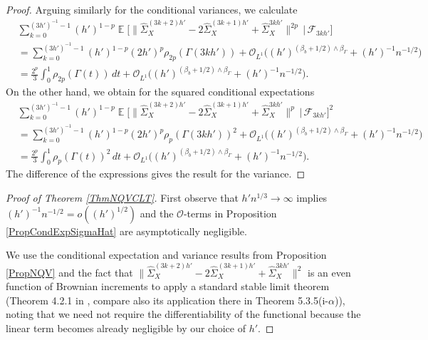 \documentclass[preprint,aos]{imsart}
\numberwithin{equation}{section}
\theoremstyle{remark}
\DeclareMathOperator{\E}{{\mathbb E}}
\providecommand{\norm}[1]{\lVert #1 \rVert}
\begin{document}
\begin{appendix}
\begin{proof}
Arguing similarly for the conditional variances,  we calculate
\begin{align}
&\sum_{k=0}^{(3h')^{-1}-1}(h')^{1-p}\E\Big[\norm{\hat\Sigma_X^{(3k+2)h'}-2\hat\Sigma_X^{(3k+1)h'}+\hat\Sigma_X^{3kh'}}^{2p}\,\Big|\,{\mathcal F}_{3kh'}\Big]\nonumber\\
&=\sum_{k=0}^{(3h')^{-1}-1}(h')^{1-p}(2h')^p\rho_{2p}(\Gamma(3kh'))+{\mathcal O}_{L^1}\Big((h')^{(\beta_b+1/2)\wedge \beta_\Gamma}+(h')^{-1}n^{-1/2}\Big)\nonumber\\
&= \frac{2^p}3\int_0^1 \rho_{2p}(\Gamma(t))\,dt+{\mathcal O}_{L^1}\Big((h')^{(\beta_b+1/2)\wedge \beta_\Gamma}+(h')^{-1}n^{-1/2}\Big).\label{EqNorm2p}
\end{align}
On the other hand, we obtain for the squared conditional expectations
\begin{align*}
&\sum_{k=0}^{(3h')^{-1}-1}(h')^{1-p}\E\Big[\norm{\hat\Sigma_X^{(3k+2)h'}-2\hat\Sigma_X^{(3k+1)h'}+\hat\Sigma_X^{3kh'}}^p\,\Big|\,{\mathcal F}_{3kh'}\Big]^2\\
&=\sum_{k=0}^{(3h')^{-1}-1}(h')^{1-p}(2h')^p\rho_p(\Gamma(3kh'))^2+{\mathcal O}_{L^1}\Big((h')^{(\beta_b+1/2)\wedge \beta_\Gamma}+(h')^{-1}n^{-1/2}\Big)\\
&= \frac{2^p}3\int_0^1 \rho_p(\Gamma(t))^2\,dt+{\mathcal O}_{L^1}\Big((h')^{(\beta_b+1/2)\wedge \beta_\Gamma}+(h')^{-1}n^{-1/2}\Big).
\end{align*}
The difference of the expressions gives the result for the variance.
\end{proof}

\begin{proof}[Proof of Theorem \ref{ThmNQVCLT}]
First observe that $h'n^{1/3}\to\infty$ implies $(h')^{-1}n^{-1/2}=o((h')^{1/2})$ and the ${\mathcal O}$-terms in Proposition \ref{PropCondExpSigmaHat} are  asymptotically negligible.

We use the conditional expectation and variance results from Proposition \ref{PropNQV} and the fact that $\norm{\hat\Sigma_X^{(3k+2)h'}-2\hat\Sigma_X^{(3k+1)h'}+\hat\Sigma_X^{3kh'}}^2$ is an even function of Brownian increments to apply a standard stable limit theorem (Theorem 4.2.1 in \citet{JacPro2011}, compare also its application there in Theorem 5.3.5(i-$\alpha$)),  noting that we need not require the differentiability of the functional because the linear term becomes already negligible by our choice of $h'$.
\end{proof}


\end{appendix}
\end{document}
